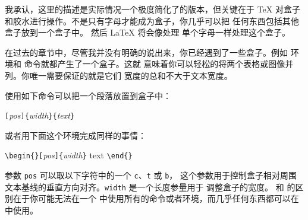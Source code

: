 我承认，这里的描述是实际情况一个极度简化了的版本，但关键在于 \TeX{} 
对盒子和胶水进行操作。不是只有字母才能成为盒子，你几乎可以把
任何东西包括其他盒子放到一个盒子中。 然后 \LaTeX{} 将会像处理
单个字母一样处理这个盒子。

在过去的章节中，尽管我并没有明确的说出来，你已经遇到了一些盒子。例如
  环境和  命令就都产生了一个盒子。这就
意味着你可以轻松的将两个表格或图像并列。你唯一需要保证的就是它们
宽度的总和不大于文本宽度。

使用如下命令可以把一个段落放置到盒子中：
\begin{lscommand}
\verb|[|\emph{pos}\verb|]{|\emph{width}\verb|}{|\emph{text}\verb|}|
\end{lscommand}

\noindent 或者用下面这个环境完成同样的事情：

\begin{lscommand}
\verb|\begin{|\verb|}[|\emph{pos}\verb|]{|\emph{width}\verb|}| text
\verb|\end{|\verb|}|
\end{lscommand}

参数 \texttt{pos} 可以取以下字符中的一个 \texttt{c}、\texttt{t}
 或 \texttt{b}，
这个参数用于控制盒子相对周围文本基线的垂直方向对齐。\texttt{width} 是一个长度参量用于
调整盒子的宽度。 和  的区别在于你可能无法在一个  中使用所有的命令或者环境，而几乎任何东西都可以在  中使用。

